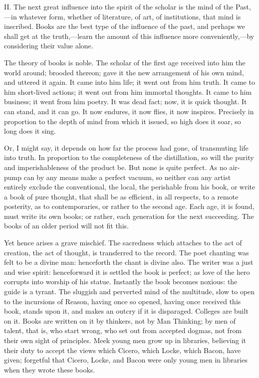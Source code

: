II. The next great influence into the spirit of the scholar is the
mind of the Past,---in whatever form, whether of literature, of art,
of institutions, that mind is inscribed. Books are the best type of
the influence of the past, and perhaps we shall get at the
truth,---learn the amount of this influence more
con\-ven\-ient\-ly,---by considering their value alone.

The theory of books is noble. The scholar of the first age received
into him the world around; brooded thereon; gave it the new
arrangement of his own mind, and uttered it again. It came into him
life; it went out from him truth. It came to him short-lived actions;
it went out from him immortal thoughts. It came to him business; it
went from him poetry. It was dead fact; now, it is quick thought. It
can  stand, and it can go. It now endures, it now flies, it
now inspires. Precisely in proportion to the depth of mind from which
it issued, so high does it soar, so long does it sing.

Or, I might say, it depends on how far the process had gone, of
transmuting life into truth. In proportion to the completeness of the
distillation, so will the purity and imperishableness of the product
be. But none is quite perfect. As no air-pump can by any means make a
perfect vacuum, so neither can any artist entirely exclude the
conventional, the local, the perishable from his book, or write a book
of pure thought, that shall be as efficient, in all respects, to a
remote posterity, as to contemporaries, or rather to the second age.
Each age, it is found, must write its own books; or rather, each
generation for the next succeeding. The books of an older period will
not fit this.

Yet hence arises a grave mischief. The sacredness which attaches to
the act of creation, the act of thought, is transferred to the record.
The poet chanting was felt to be a divine man: henceforth the chant is
divine also. The writer was a just and wise spirit: henceforward it is
settled the book is perfect; as love of the hero corrupts into worship
of his statue. Instantly  the book becomes noxious: the guide
is a tyrant. The sluggish and perverted mind of the multitude, slow to
open to the incursions of Reason, having once so opened, having once
received this book, stands upon it, and makes an outcry if it is
disparaged. Colleges are built on it. Books are written on it by
thinkers, not by Man Thinking; by men of talent, that is, who start
wrong, who set out from accepted dogmas, not from their own sight of
principles. Meek young men grow up in libraries, believing it their
duty to accept the views which Cicero, which Locke, which Bacon, have
given; forgetful that Cicero, Locke, and Bacon were only young men in
libraries when they wrote these books.

